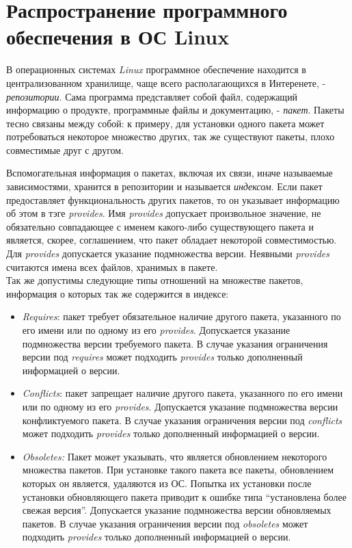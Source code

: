 \section{Распространение программного обеспечения в ОС Linux}

В операционных системах \textit{Linux} программное обеспечение находится
в централизованном хранилище, чаще всего располагающихся в Интеренете,
- \textit{репозитории}. Сама программа представляет собой файл, содержащий
информацию о продукте, программные файлы и документацию, - \textit{пакет}. 
Пакеты тесно связаны между собой: к примеру, для установки одного пакета
может потребоваться некоторое множество других, так же существуют пакеты, плохо
совместимые друг с другом. 

Вспомогательная информация о пакетах, включая их связи, иначе называемые зависимостями,
хранится в репозитории и называется \textit{индексом}. Если пакет предоставляет 
функциональность других пакетов, то он указывает информацию об этом в тэге \textit{provides}.
Имя \textit{provides} допускает произвольное значение, не обязательно совпадающее с
именем какого-либо существующего  пакета и является, скорее, соглашением, что пакет
обладает некоторой совместимостью. Для \textit{provides} допускается указание подмножества 
версии. Неявными \textit{provides} считаются имена всех файлов, хранимых в пакете.\\

Так же допустимы следующие типы отношений на множестве пакетов, информация о которых так
же содержится в индексе:
\begin{itemize}
\item{\textit{Requires}: пакет требует обязательное наличие другого пакета, указанного
по его имени или по одному из его \textit{provides}. Допускается указание 
подмножества версии требуемого пакета. В случае указания ограничения версии
под \textit{requires} может подходить \textit{provides} только дополненный информацией
о версии.}
\item{\textit{Conflicts}: пакет запрещает наличие другого пакета, указанного по его имени
 или по одному из его \textit{provides}. Допускается указание подмножества
версии конфликтуемого пакета. В случае указания ограничения версии
под \textit{conflicts} может подходить \textit{provides} только дополненный информацией
о версии.}
\item{\textit{Obsoletes:} Пакет может указывать, что является обновлением некоторого
множества пакетов. При установке такого пакета все пакеты, обновлением
которых он является, удаляются из ОС. Попытка их установки после
установки обновляющего пакета приводит к ошибке типа ``установлена
более свежая версия''. Допускается указание подмножества версии обновляемых
пакетов. В случае указания ограничения версии под \textit{obsoletes} может
подходить \textit{provides} только дополненный информацией о версии.}
\end{itemize}

